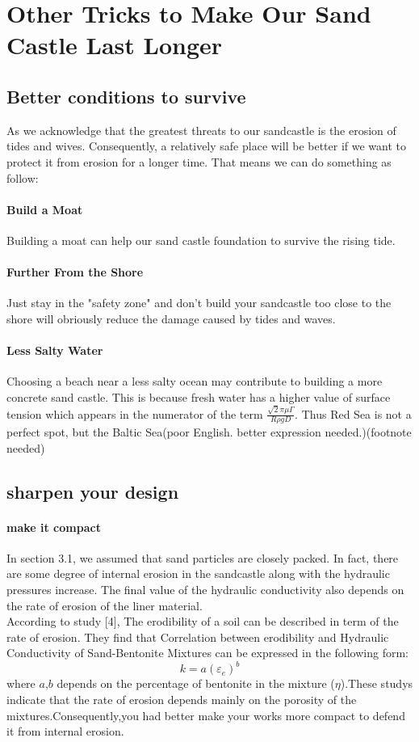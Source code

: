 \documentclass[12pt]{article}
\begin{document}
\section{Other Tricks to Make Our Sand Castle Last Longer}
\subsection{Better conditions to survive}
As we acknowledge that the greatest threats to our sandcastle is the erosion of tides and wives. Consequently, a relatively safe place will be better if we want to protect it from erosion for a longer time. That means we can do something as follow:
\paragraph{Build a Moat}
Building a moat can help our sand castle foundation to survive the rising tide.
\paragraph{Further From the Shore}
Just stay in the "safety zone" and don't build your sandcastle too close to the shore will obriously reduce the damage caused by tides and waves.
\paragraph{Less Salty Water}
Choosing a beach near a less salty ocean may contribute to building a more concrete sand castle. This is because fresh water has a higher value of surface tension which appears in the numerator of the term $\frac{\sqrt{2}\pi\mu\Gamma}{R\rho gD}$. Thus Red Sea is not a perfect spot, but the Baltic Sea(poor English. better expression needed.)(footnote needed)
\subsection{sharpen your design}
\paragraph{make it compact}
In section 3.1, we assumed that sand particles are closely packed. In fact, there are some degree of internal erosion in the sandcastle along with the hydraulic pressures increase. The final value of the hydraulic conductivity also depends on the rate of erosion of the liner material.\\
According to study [4], The erodibility of a soil can be described in term of the rate of erosion. They find that Correlation between erodibility and Hydraulic Conductivity of Sand-Bentonite Mixtures can be expressed in the following form:
$$
    k = a(\varepsilon_e)^b
$$
where $a$,$b$ depends on the percentage of bentonite in the mixture ($\eta$).These studys indicate that the rate of erosion depends mainly on the porosity of the mixtures.Consequently,you had better make your works more compact to defend it from internal erosion.
\end{document}
